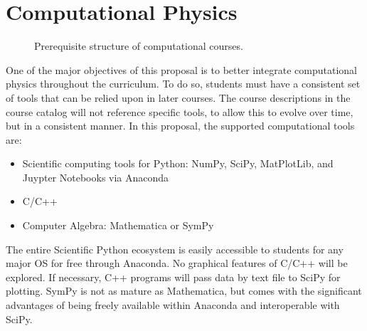 \documentclass[12pt]{article}
\begin{document}
\section{Computational Physics}
\label{sec:comp}

\begin{figure}
\begin{center}

\caption{\label{fig:comps} Prerequisite structure of computational courses.}

\end{center}
\end{figure}

One of the major objectives of this proposal is to better integrate
computational physics throughout the curriculum.  To do so, students
must have a consistent set of tools that can be relied upon in later
courses.  The course descriptions in the course catalog will not
reference specific tools, to allow this to evolve over time, but in a
consistent manner.  In this proposal, the supported computational
tools are:
\begin{itemize}
\item Scientific computing tools for Python: NumPy, SciPy, MatPlotLib,
  and Juypter Notebooks via Anaconda
\item C/C++
\item Computer Algebra:  Mathematica or SymPy
\end{itemize}
The entire Scientific Python ecosystem is easily accessible to
students for any major OS for free through Anaconda.  No graphical
features of C/C++ will be explored.  If necessary, C++ programs will
pass data by text file to SciPy for plotting.  SymPy is not as mature
as Mathematica, but comes with the significant advantages of being
freely available within Anaconda and interoperable with SciPy.
\end{document}

